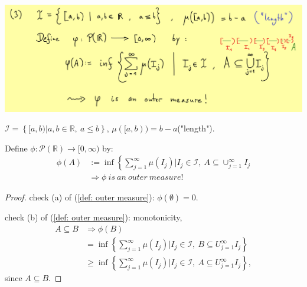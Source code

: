 \documentclass[../../note.tex]{subfiles}
\begin{document}
\includegraphics[scale = 0.3]{../figures/outer measure.png}
\begin{example}
    $\mathcal{I} = \left\{[a,b) \vert a,b \in \mathbb{R},~a \leq b\right\}$, $\mu([a,b)) = b-a$("length").

    Define $\phi: \mathcal{P}(\mathbb{R}) \rightarrow [0,\infty)$ by:
    \begin{align}
        \phi(A)
        &:= \inf\left\{\sum_{j=1}^{\infty} \mu(I_j) \vert I_j \in \mathcal{I},~A \subseteq \cup_{j=1}^{\infty} I_j \right. \\
        &\Longrightarrow \phi~is~an~outer~measure!
    \end{align}
    \begin{proof}
        check (a) of (\ref{def: outer measure}): $\phi(\emptyset) = 0$.

        check (b) of (\ref{def: outer measure}): monotonicity, 
        \begin{align}
            A \subseteq B 
            &\Longrightarrow \phi(B) \\
            &= \inf\left\{\sum_{j=1}^{\infty} \mu(I_j) \vert I_j \in \mathcal{I},~B \subseteq U_{j=1}^{\infty} I_j \right\} \\
            & \geq \inf\left\{\sum_{j=1}^{\infty} \mu(I_j) \vert I_j \in \mathcal{I},~A \subseteq U_{j=1}^{\infty} I_j \right\},
        \end{align}
        since $A \subseteq B$.


\end{proof}
\end{example}
\end{document}
